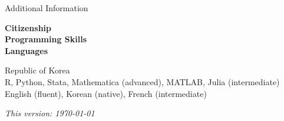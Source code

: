 \documentclass{resume} %
\begin{document}

	\begin{rSection}{Additional Information}
		\begin{minipage}[t]{0.25\textwidth}
			\textbf{Citizenship} \\
			\textbf{Programming Skills} \\
			\textbf{Languages}
		\end{minipage}
		\begin{minipage}[t]{0.75\textwidth}
			Republic of Korea \\
			R, Python, Stata, Mathematica (advanced), MATLAB, Julia (intermediate) \\
			English (fluent), Korean (native), French (intermediate)
		\end{minipage}
	\end{rSection}

	\vfill
	\flushright \textit{This version: \today}
\end{document}
